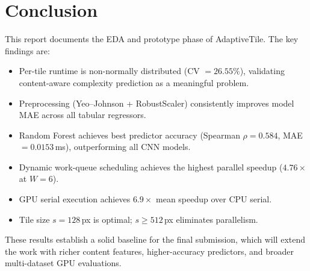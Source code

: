 \documentclass[12pt,a4paper]{article}
\begin{document}
\section*{Conclusion}

This report documents the EDA and prototype phase of AdaptiveTile. The key findings are:

\begin{itemize}[leftmargin=*]
  \item Per-tile runtime is non-normally distributed (CV $=26.55\%$), validating
        content-aware complexity prediction as a meaningful problem.
  \item Preprocessing (Yeo--Johnson + RobustScaler) consistently improves model
        MAE across all tabular regressors.
  \item Random Forest achieves best predictor accuracy
        (Spearman $\rho=0.584$, MAE $=0.0153$\,ms), outperforming all CNN models.
  \item Dynamic work-queue scheduling achieves the highest parallel speedup
        ($4.76\times$ at $W=6$).
  \item GPU serial execution achieves $6.9\times$ mean speedup over CPU serial.
  \item Tile size $s=128$\,px is optimal; $s\geq512$\,px eliminates parallelism.
\end{itemize}

These results establish a solid baseline for the final submission, which will extend the work with richer content features, higher-accuracy predictors, and broader multi-dataset GPU evaluations.
\end{document}
